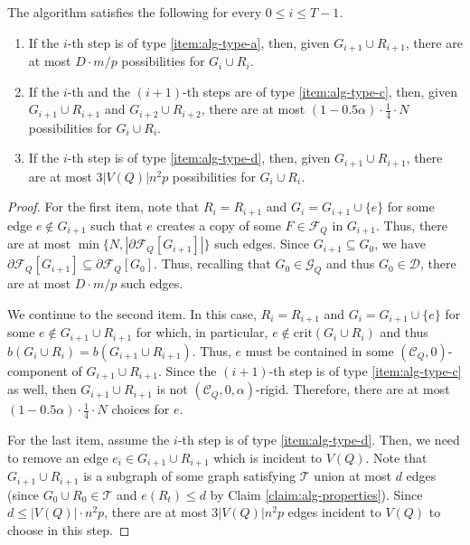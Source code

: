 \documentclass[11pt,a4paper,oneside,reqno]{amsart}
\newcommand{\cC}{\mathcal{C}}
\newcommand{\cD}{\mathcal{D}}
\newcommand{\cF}{\mathcal{F}}
\newcommand{\cG}{\mathcal{G}}
\newcommand{\cT}{\mathcal{T}}
\newcommand{\1}{\mathbbm{1}} %
\renewcommand{\le}{\leqslant}
\newcommand{\crit}{\mathrm{crit}}
\begin{document}
\begin{claim}\label{claim:algorithm-bounds-backwards}
    The algorithm satisfies the following for every $0 \le i \le T-1$.
    \begin{enumerate}
        \item If the $i$-th step is of type \ref{item:alg-type-a}, then, given $G_{i+1} \cup R_{i+1}$, there are at most $D \cdot m/p$ possibilities for $G_{i} \cup R_{i}$.

        \item If the $i$-th and the $(i+1)$-th steps are of type \ref{item:alg-type-c}, then, given $G_{i+1} \cup R_{i+1}$ and $G_{i+2} \cup R_{i+2}$, there are at most $(1-0.5\alpha)\cdot \frac{1}{4} \cdot N$ possibilities for $G_{i} \cup R_{i}$.
        
        \item If the $i$-th step is of type \ref{item:alg-type-d}, then, given $G_{i+1} \cup R_{i+1}$, there are at most $3 |V(Q)| n^2 p$ possibilities for $G_{i} \cup R_{i}$.
    \end{enumerate}
\end{claim}
\begin{proof}
    For the first item, note that $R_{i} = R_{i+1}$ and $G_{i} = G_{i+1} \cup \{e\}$ for some edge $e \notin G_{i+1}$ such that $e$ creates a copy of some $F \in \cF_Q$ in $G_{i+1}$. Thus, there are at most $\min\{N, |\partial\cF_Q[G_{i+1}]|\}$ such edges. Since $G_{i+1} \subseteq G_{0}$, we have $\partial\cF_Q[G_{i+1}] \subseteq \partial\cF_Q[G_{0}]$. Thus, recalling that $G_0 \in \cG_Q$ and thus $G_0 \in \cD$, there are at most $D \cdot m / p$ such edges.

    We continue to the second item. In this case, $R_{i} = R_{i+1}$ and $G_{i} = G_{i+1} \cup \{e\}$ for some $e \notin G_{i+1} \cup R_{i+1}$ for which, in particular, $e \notin \crit(G_i \cup R_i)$ and thus $b(G_i \cup R_i) = b(G_{i+1} \cup R_{i+1})$. Thus, $e$ must be contained in some $(\cC_Q, 0)$-component of $G_{i+1} \cup R_{i+1}$. Since the $(i+1)$-th step is of type \ref{item:alg-type-c} as well, then $G_{i+1} \cup R_{i+1}$ is not $(\cC_Q, 0, \alpha)$-rigid. Therefore, there are at most $(1-0.5\alpha)\cdot \frac{1}{4} \cdot N$ choices for $e$.
    
    For the last item, assume the $i$-th step is of type \ref{item:alg-type-d}. Then, we need to remove an edge $e_i \in G_{i+1} \cup R_{i+1}$ which is incident to $V(Q)$. Note that $G_{i+1} \cup R_{i+1}$ is a subgraph of some graph satisfying $\cT$ union at most $d$ edges (since $G_0 \cup R_0 \in \cT$ and $e(R_t) \le d$ by Claim \ref{claim:alg-properties}). Since $d \le |V(Q)| \cdot n^2 p$, there are at most $3 |V(Q)| n^2 p$ edges incident to $V(Q)$ to choose in this step.
\end{proof}
\end{document}
